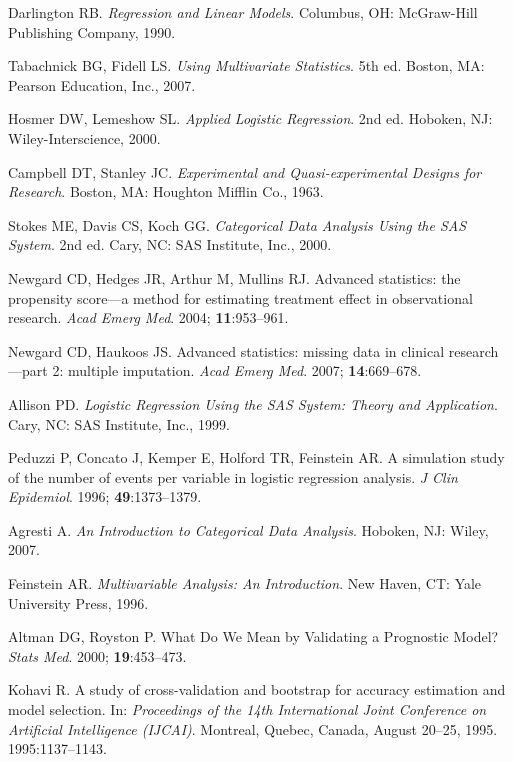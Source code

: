 \documentclass[12pt]{article}
\begin{document}
\begin{thebibliography}{99}

Darlington RB. \textit{Regression and Linear Models}. Columbus, OH: McGraw-Hill Publishing Company, 1990.

Tabachnick BG, Fidell LS. \textit{Using Multivariate Statistics}. 5th ed. Boston, MA: Pearson Education, Inc., 2007.

Hosmer DW, Lemeshow SL. \textit{Applied Logistic Regression}. 2nd ed. Hoboken, NJ: Wiley-Interscience, 2000.

Campbell DT, Stanley JC. \textit{Experimental and Quasi-experimental Designs for Research}. Boston, MA: Houghton Mifflin Co., 1963.

Stokes ME, Davis CS, Koch GG. \textit{Categorical Data Analysis Using the SAS System}. 2nd ed. Cary, NC: SAS Institute, Inc., 2000.

Newgard CD, Hedges JR, Arthur M, Mullins RJ. Advanced statistics: the propensity score—a method for estimating treatment effect in observational research. \textit{Acad Emerg Med}. 2004; \textbf{11}:953–961.

Newgard CD, Haukoos JS. Advanced statistics: missing data in clinical research—part 2: multiple imputation. \textit{Acad Emerg Med}. 2007; \textbf{14}:669–678.

Allison PD. \textit{Logistic Regression Using the SAS System: Theory and Application}. Cary, NC: SAS Institute, Inc., 1999.

Peduzzi P, Concato J, Kemper E, Holford TR, Feinstein AR. A simulation study of the number of events per variable in logistic regression analysis. \textit{J Clin Epidemiol}. 1996; \textbf{49}:1373–1379.

Agresti A. \textit{An Introduction to Categorical Data Analysis}. Hoboken, NJ: Wiley, 2007.

Feinstein AR. \textit{Multivariable Analysis: An Introduction}. New Haven, CT: Yale University Press, 1996.

Altman DG, Royston P. What Do We Mean by Validating a Prognostic Model? \textit{Stats Med}. 2000; \textbf{19}:453–473.

Kohavi R. A study of cross-validation and bootstrap for accuracy estimation and model selection. In: \textit{Proceedings of the 14th International Joint Conference on Artificial Intelligence (IJCAI)}. Montreal, Quebec, Canada, August 20–25, 1995. 1995:1137–1143.


\end{thebibliography}
\end{document}
